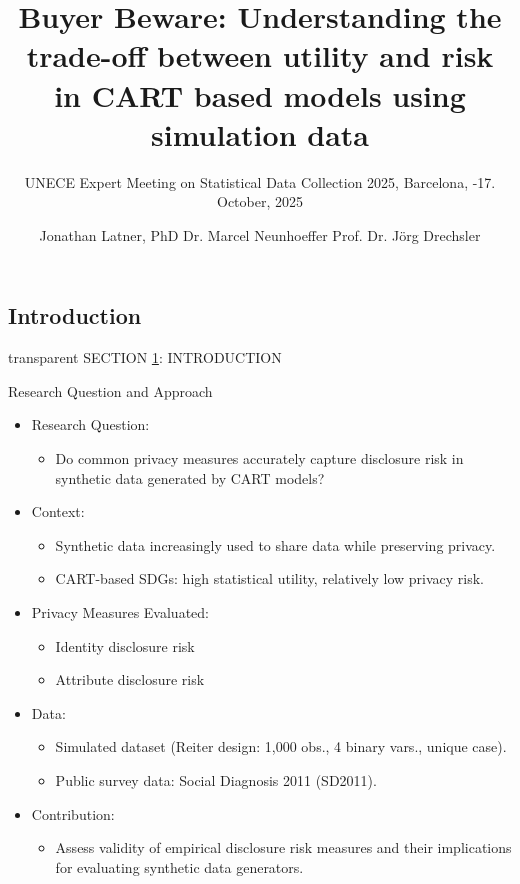 \documentclass[t,8pt,utfx8]{beamer}
\title{Buyer Beware: Understanding the trade-off between utility and risk in CART based models using simulation data}
\subtitle{
UNECE Expert Meeting on Statistical Data Collection 2025, \newline Barcelona, \newline 15-17. October, 2025}
\author{Jonathan Latner, PhD \newline Dr. Marcel Neunhoeffer \newline Prof. Dr. Jörg Drechsler}
\begin{document}
\frame[plain]{\titlepage}

\begin{spacing}{1.25}

\section{Introduction}\label{sec:introduction}

\begin{frame}[c,plain]
\vskip-4mm
\begin{beamercolorbox}[wd=\boxwidth,ht=22.11mm]{transparent}%
    \vfill%
    \leftinsert%
    \MakeUppercase{Section \ref{sec:introduction}: Introduction
} %
\end{beamercolorbox}
\vskip-3mm
\end{frame}

\begin{frame}{Research Question and Approach}
\begin{itemize}
    \item Research Question: 
    \begin{itemize}
        \item  Do common privacy measures accurately capture disclosure risk in synthetic data generated by CART models?
    \end{itemize}
    \item Context:
    \begin{itemize}
        \item Synthetic data increasingly used to share data while preserving privacy.
        \item CART-based SDGs: high statistical utility, relatively low privacy risk.
    \end{itemize}
    \item Privacy Measures Evaluated:
    \begin{itemize}
        \item Identity disclosure risk
        \item Attribute disclosure risk
    \end{itemize}
    \item Data:
    \begin{itemize}
        \item Simulated dataset (Reiter design: 1,000 obs., 4 binary vars., unique case).
        \item Public survey data: Social Diagnosis 2011 (SD2011).
    \end{itemize}
    \item Contribution: 
    \begin{itemize}
        \item Assess validity of empirical disclosure risk measures and their implications for evaluating synthetic data generators.
    \end{itemize}
\end{itemize}
\end{frame}


\end{spacing}
\end{document}
